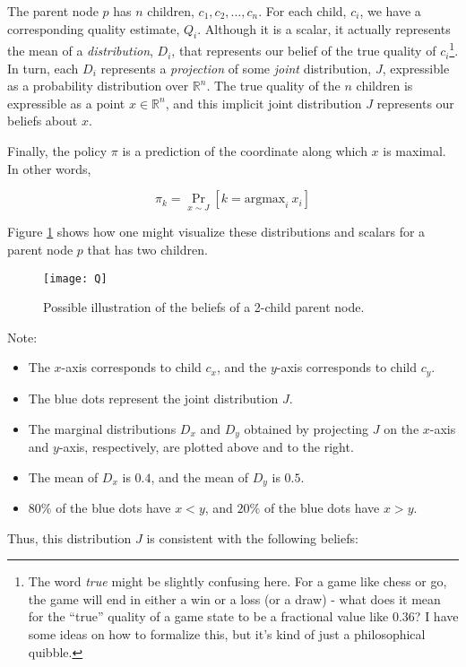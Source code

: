 \documentclass[tikz]{article}
\newcommand{\argmax}{\mathrm{argmax}}
\begin{document}
The parent node $p$ has $n$ children, $c_1, c_2, \ldots, c_n$. For each child, $c_i$, we have a corresponding
quality estimate, $Q_i$.
Although it is a scalar, it actually represents the mean of a \emph{distribution}, $D_i$, that represents our belief of the
true quality of $c_i$\footnote{The word \emph{true} might be slightly confusing here. For a game like chess or go, the game will
end in either a win or a loss (or a draw) - what does it mean for the ``true'' quality of a game state to be a fractional value like 0.36?
I have some ideas on how to formalize this, but it's kind of just a philosophical quibble.}.
In turn, each $D_i$ represents a \emph{projection} of some \emph{joint} distribution, $J$, expressible as
a probability distribution over $\mathbb{R}^n$. The true quality of the $n$ children is expressible as a point $x \in \mathbb{R}^n$,
and this implicit joint distribution $J$ represents our beliefs about $x$.\newline

Finally, the policy $\pi$ is a prediction of the coordinate along which $x$ is maximal. In other words,

$$
\pi_k = \Pr_{x \sim J}[k = \argmax_i\ x_i]
$$

Figure \ref{Q-figure} shows how one might visualize these distributions and scalars for a parent node $p$ that has two children. 

\begin{figure}[h]
\caption{Possible illustration of the beliefs of a 2-child parent node.}
\label{Q-figure}
\centering
\texttt{[image: Q]}
\end{figure}

Note:

\begin{itemize}
    \item The $x$-axis corresponds to child $c_x$, and the $y$-axis corresponds to child $c_y$.
    \item The blue dots represent the joint distribution $J$.
    \item The marginal distributions $D_x$ and $D_y$ obtained by projecting $J$ on the $x$-axis and $y$-axis, respectively, are plotted above and to the right.
    \item The mean of $D_x$ is $0.4$, and the mean of $D_y$ is $0.5$.
    \item $80\%$ of the blue dots have $x<y$, and $20\%$ of the blue dots have $x>y$.
\end{itemize}

Thus, this distribution $J$ is consistent with the following beliefs:
\end{document}
